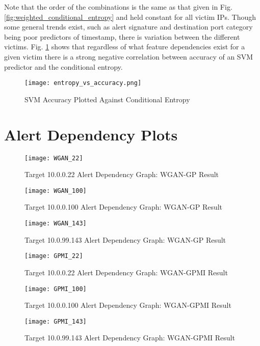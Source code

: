 \begin{appendices}
	Note that the order of the combinations is the same as that given in Fig. \ref{fig:weighted_conditional_entropy} and held constant for all victim IPs. Though some general trends exist, such as alert signature and destination port category being poor predictors of timestamp, there is variation between the different victims. Fig. \ref{fig:entropy_v_accuracy} shows that regardless of what feature dependencies exist for a given victim there is a strong negative correlation between accuracy of an SVM predictor and the conditional entropy.
	
	\begin{figure}[!htbp]
		\centering
		\texttt{[image: entropy\_vs\_accuracy.png]}
		\caption{SVM Accuracy Plotted Against Conditional Entropy}
		\label{fig:entropy_v_accuracy}
	\end{figure}
	
	
\chapter{Alert Dependency Plots}
	\label{sec:depend_app}
	
	\begin{figure}[!htbp]
		\centering
		\texttt{[image: WGAN\_22]}
		\caption{
			Target 10.0.0.22 Alert Dependency Graph: WGAN-GP Result
		}
		\label{fig:alert_depend_2}
	\end{figure}
	
	\begin{figure}[!htbp]
		\centering
		\texttt{[image: WGAN\_100]}
		\caption{
			Target 10.0.0.100 Alert Dependency Graph: WGAN-GP Result
		}
		\label{fig:alert_depend_3}
	\end{figure}
	
	\begin{figure}[!htbp]
		\centering
		\texttt{[image: WGAN\_143]}
		\caption{
			Target 10.0.99.143 Alert Dependency Graph: WGAN-GP Result 
		}
		\label{fig:alert_depend_4}
	\end{figure}

	\begin{figure}[!htbp]
		\centering
		\texttt{[image: GPMI\_22]}
		\caption{
			Target 10.0.0.22 Alert Dependency Graph: WGAN-GPMI Result
		}
		\label{fig:alert_depend_6}
	\end{figure}
	
	\begin{figure}[!htbp]
		\centering
		\texttt{[image: GPMI\_100]}
		\caption{
			Target 10.0.0.100 Alert Dependency Graph: WGAN-GPMI Result
		}
		\label{fig:alert_depend_7}
	\end{figure}
	
	\begin{figure}[!htbp]
		\centering
		\texttt{[image: GPMI\_143]}
		\caption{
			Target 10.0.99.143 Alert Dependency Graph: WGAN-GPMI Result 
		}
		\label{fig:alert_depend_8}
	\end{figure}

\end{appendices}
